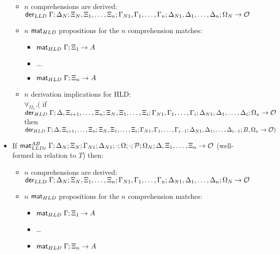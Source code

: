 \begin{theorem}
\begin{itemize}[leftmargin=*]
   \begin{itemize}[leftmargin=\secondm]
      \item $n$ comprehensions are derived:\\
      $\mathsf{der}_{LLD} \; \Gamma; \Delta_N; \Xi_N, \Xi_1, \dotsc, \Xi_n; \Gamma_{N1},
      \Gamma_1, \dotsc, \Gamma_n; \Delta_{N1}, \Delta_1, \dotsc, \Delta_n; \Omega_N \rightarrow \mathcal{O}$
      \item $n$ $\mathsf{mat}_{HLD} \;$propositions for the $n$ comprehension matches:
      \begin{itemize}[leftmargin=\thirdm]
         \item $\mathsf{mat}_{HLD} \; \Gamma; \Xi_1 \rightarrow A$
         \item $\dots$
         \item $\mathsf{mat}_{HLD} \; \Gamma; \Xi_n \rightarrow A$
      \end{itemize}
      \item $n$ derivation implications for HLD: \\
      $\forall_{\Omega_x}.($ if $\mathsf{der}_{HLD} \; \Gamma; \Delta, \Xi_{i+1}, \dotsc, \Xi_{n}; \Xi_N, \Xi_1,
            \dotsc, \Xi_i; \Gamma_{N1}, \Gamma_1, \dotsc, \Gamma_i; \Delta_{N1},
            \Delta_1, \dotsc, \Delta_i; \Omega_x \rightarrow \mathcal{O}$ then $\mathsf{der}_{HLD} \; \Gamma; \Delta, \Xi_{i+1}, \dotsc, \Xi_{n}; \Xi_N, \Xi_1,
            \dotsc,
            \Xi_i; \Gamma_{N1}, \Gamma_1, \dotsc, \Gamma_{i-1}; \Delta_{N1},
            \Delta_1, \dotsc, \Delta_{i-1}; B, \Omega_x \rightarrow \mathcal{O})$
   \end{itemize}

   \item If $\mathsf{mat}_{LLDc}^{AB} \; \Gamma; \Delta_N; \Xi_N; \Gamma_{N1}; \Delta_{N1}; \cdot; \Omega;
      \cdot; \mathcal{P}; \Omega_N; \Delta, \Xi_1, \dotsc, \Xi_n \rightarrow \mathcal{O}$ (well-formed in relation to $T$) then:

   \begin{itemize}[leftmargin=\secondm]
      \item $n$ comprehensions are derived:\\
      $\mathsf{der}_{LLD} \; \Gamma; \Delta_N; \Xi_N, \Xi_1, \dotsc, \Xi_n; \Gamma_{N1},
      \Gamma_1, \dotsc, \Gamma_n; \Delta_{N1}, \Delta_1, \dotsc, \Delta_n; \Omega_N \rightarrow \mathcal{O}$

      \item $n$ $\mathsf{mat}_{HLD} \;$propositions for the $n$ comprehension matches:
      \begin{itemize}[leftmargin=\thirdm]
         \item $\mathsf{mat}_{HLD} \; \Gamma; \Xi_1 \rightarrow A$
         \item \dots
         \item $\mathsf{mat}_{HLD} \; \Gamma; \Xi_n \rightarrow A$
      \end{itemize}


\end{itemize}
\end{itemize}
\end{theorem}
